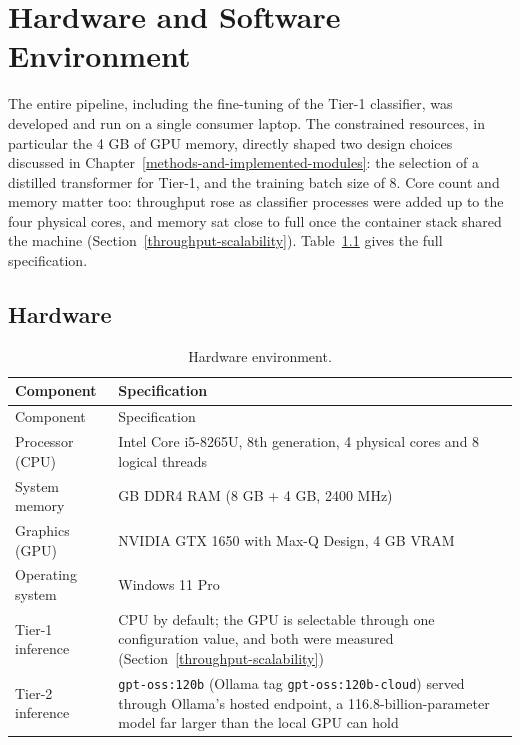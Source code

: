 \chapter{Hardware and Software Environment}\label{hardware-and-software-environment}

The entire pipeline, including the fine-tuning of the Tier-1 classifier, was developed and run on a single consumer laptop. The constrained resources, in particular the 4 GB of GPU memory, directly shaped two design choices discussed in Chapter~\ref{methods-and-implemented-modules}: the selection of a distilled transformer for Tier-1, and the training batch size of 8. Core count and memory matter too: throughput rose as classifier processes were added up to the four physical cores, and memory sat close to full once the container stack shared the machine (Section~\ref{throughput-scalability}). Table~\ref{tab:env-hardware} gives the full specification.

\section{Hardware}\label{appendix-hardware}

\begin{longtable}{@{}
  >{\raggedright\arraybackslash}p{}
  >{\raggedright\arraybackslash}p{}@{}}
\caption{Hardware environment.}\label{tab:env-hardware}\tabularnewline
\toprule
Component & Specification \\
\midrule
\endfirsthead
\toprule
Component & Specification \\
\midrule
\endhead
\bottomrule
\endlastfoot
Processor (CPU) & Intel Core i5-8265U, 8th generation, 4 physical cores and 8 logical threads \\
System memory & 12 GB DDR4 RAM (8 GB + 4 GB, 2400 MHz) \\
Graphics (GPU) & NVIDIA GTX 1650 with Max-Q Design, 4 GB VRAM \\
Operating system & Windows 11 Pro \\
Tier-1 inference & CPU by default; the GPU is selectable through one configuration value, and both were measured (Section~\ref{throughput-scalability}) \\
Tier-2 inference & \texttt{gpt-oss:120b} (Ollama tag \texttt{gpt-oss:120b-cloud}) served through Ollama's hosted endpoint, a 116.8-billion-parameter model far larger than the local GPU can hold \\
\end{longtable}

